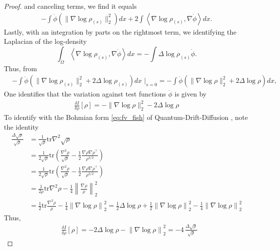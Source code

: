 \documentclass[reqno,11pt,letterpaper]{amsart}
\theoremstyle{plain}
\theoremstyle{definition}
\theoremstyle{remark}
\newcommand{\tr}{\mathrm{tr}}
\begin{document}
\begin{proof}
         and canceling terms, we find it equals
        \begin{align*}
         -\int \dot{\phi} \left(
        \lVert \nabla \log \rho_{(s)} \rVert_{2}^{2}  \right) dx + 2\int \left\langle \nabla \log \rho_{(s)}, \nabla \dot{\phi} \right\rangle dx.
    \end{align*}
    Lastly, with an integration by parts on the rightmost term, we identifying the Laplacian of the log-density
    \[
    \int_{\Omega} \left\langle \nabla \log \rho_{(s)}, \nabla \dot{\phi} \right\rangle dx = - \int \Delta \log \rho_{(s)}\dot{\phi}.
    \]
    Thus, from
    \begin{align*}
    &-\int \dot{\phi} \left(
        \lVert \nabla \log \rho_{(s)} \rVert_{2}^{2}   +2  \Delta \log \rho_{(s)} \right) dx \,\,\bigg|_{s=0} = -\int \dot{\phi} \left(
        \lVert \nabla \log \rho \rVert_{2}^{2}   +2  \Delta \log \rho \right) dx,
    \end{align*}
    One identifies that the variation against test functions $\dot\phi$ is given by
    \begin{align*}
        \frac{\delta I}{\delta \rho} [\rho] = -\lVert \nabla \log \rho \rVert_{2}^{2}   -2  \Delta \log \rho
    \end{align*}
    To identify with the Bohmian form \eqref{eq:fv_fish} of Quantum-Drift-Diffusion \cite{Gianazza2008}, note the identity
    \begin{align*}
        \frac{\Delta \sqrt{ \rho}}{\sqrt{\rho}} &= \frac{1}{\sqrt{\rho}} \tr \nabla^{2} \sqrt{\rho}\\
        &= \frac{1}{2\sqrt{\rho}} \tr \left(  \frac{\nabla^{2} \rho}{\sqrt{\rho}} - \frac{1}{2} \frac{\nabla \rho \nabla \rho^{\top}}{\rho^{3/2}}   \right) \\
        &= \frac{1}{2\sqrt{\rho}} \tr \left(  \frac{\nabla^{2} \rho}{\sqrt{\rho}} - \frac{1}{2} \frac{\nabla \rho \nabla \rho^{\top}}{\rho^{3/2}}   \right)\\
        &=\frac{1}{2\rho} \tr \nabla^{2} \rho - \frac{1}{4}  \left\lVert \frac{\nabla \rho}{\rho} \right\rVert_{2}^{2} \\
        &= \frac{1}{2} \tr \frac{\nabla^{2} \rho}{\rho} - \frac{1}{4}  \left\lVert \nabla \log \rho \right\rVert_{2}^{2} = \frac{1}{2} \Delta \log \rho + \frac{1}{2} \left\lVert \nabla \log \rho \right\rVert_{2}^{2} - \frac{1}{4}  \left\lVert \nabla \log \rho \right\rVert_{2}^{2}
        \end{align*}
        Thus, 
    \begin{align*}
        &\frac{\delta I}{\delta \rho} [\rho] = -2 \Delta \log \rho -  \left\lVert \nabla \log \rho \right\rVert_{2}^{2} = -4\, \frac{\Delta \sqrt{ \rho}}{\sqrt{\rho}}
    \end{align*}
\end{proof}
\end{document}

